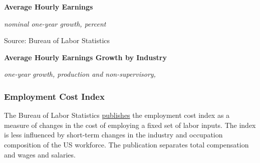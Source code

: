 \documentclass{report}
\makeatletter
\newcommand{\tbllink}[1]{\href{https://raw.githubusercontent.com/bdecon/US-chartbook/master/chartbook/data/#1}{\faTable}}
\newcommand*\short[1]{\expandafter\@gobbletwo\number\numexpr#1\relax}
\newcommand{\dateaxisticks}{
		date coordinates in=x, axis line style={draw=none},
		xmax={2020-08-10},
		max space between ticks=40,	    
		xtick={{1990-01-01}, {1992-01-01}, {1994-01-01}, 
			{1996-01-01}, {1998-01-01}, {2000-01-01}, 
			{2002-01-01}, {2004-01-01}, {2006-01-01},
			{2008-01-01}, {2010-01-01}, {2012-01-01}, {2014-01-01},
		    {2016-01-01}, {2018-01-01}, {2020-01-01}},
		minor xtick={{1989-01-01}, {1991-01-01}, {1993-01-01},
			{1995-01-01}, {1997-01-01}, {1999-01-01}, 
			{2001-01-01}, {2003-01-01}, {2005-01-01}, {2007-01-01},
		    {2009-01-01}, {2011-01-01}, {2013-01-01}, {2015-01-01},
		    {2017-01-01}, {2019-01-01}},
		enlarge y limits={0.06}, enlarge x limits={0.01},
		}
\newcommand{\bbar}[2]{extra #1 ticks = {{#2}}, extra #1 tick labels = ,
		extra #1 tick style = {grid=major, grid style={thick, black!25}},}
\newcommand{\stdline}[4]{\addplot[very thick, no markers, color=#1] 
		table [x=#2, y=#3, col sep=comma] {#4};	}
\newcommand{\thickline}[4]{\addplot[ultra thick, no markers, color=#1] 
		table [x=#2, y=#3, col sep=comma] {#4};	}
\newcommand{\rbars}{
		\fill[color=black!10] (axis cs:{1990-07-01},\pgfkeysvalueof{/pgfplots/ymin}) rectangle 
			(axis cs:{1991-03-01}, \pgfkeysvalueof{/pgfplots/ymax});
		\fill[color=black!10] (axis cs:{2007-12-01},\pgfkeysvalueof{/pgfplots/ymin}) rectangle 
			(axis cs:{2009-07-01}, \pgfkeysvalueof{/pgfplots/ymax});
		\fill[color=black!10] (axis cs:{2001-03-01},\pgfkeysvalueof{/pgfplots/ymin}) rectangle 
			(axis cs:{2001-11-01}, \pgfkeysvalueof{/pgfplots/ymax});
		\fill[color=black!10] (axis cs:{2020-02-01},\pgfkeysvalueof{/pgfplots/ymin}) rectangle 
			(axis cs:{2020-09-01}, \pgfkeysvalueof{/pgfplots/ymax});}
\makeatother
\begin{document}
{{{{{{{{{\begin{minipage}{0.76\textwidth}
\vspace{2mm}

\normalsize \textbf{Average Hourly Earnings}

\footnotesize{\textit{nominal one-year growth, percent}}

\hspace*{-2mm} 

\footnotesize{Source: Bureau of Labor Statistics} \hfill \tbllink{ahe.csv}

\vspace{5mm}

\small  

\vspace{5mm}

\normalsize \textbf{Average Hourly Earnings Growth by Industry}

\footnotesize{\textit{one-year growth, production and non-supervisory, }}


\end{minipage}


\newpage

\subsubsection*{\color{black!70} \seriffont Employment Cost Index}

\begin{minipage}{0.76\textwidth}
\small The Bureau of Labor Statistics \href{https://www.bls.gov/news.release/eci.nr0.htm}{publishes} the employment cost index as a measure of changes in the cost of employing a fixed set of labor inputs. The index is less influenced by short-term changes in the industry and occupation composition of the US workforce. The publication separates total compensation and wages and salaries.

\end{minipage}

}}}}}}}}}
\end{document}
